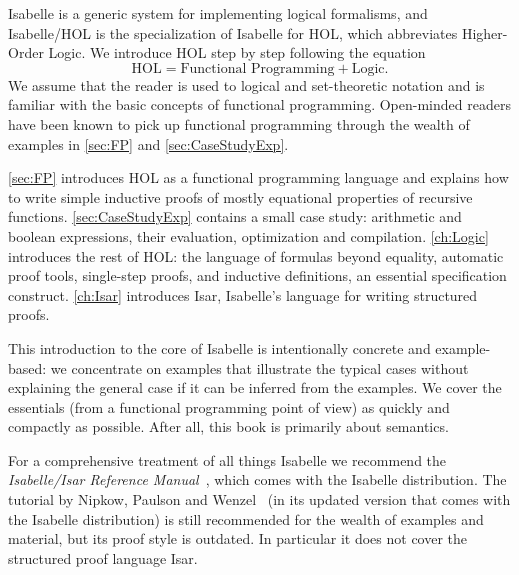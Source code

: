 Isabelle is a generic system for
implementing logical formalisms, and Isabelle/HOL is the specialization
of Isabelle for HOL, which abbreviates Higher-Order Logic. We introduce
HOL step by step following the equation
\[ \mbox{HOL} = \mbox{Functional Programming} + \mbox{Logic}. \]
We assume that the reader is used to logical and set-theoretic notation
and is familiar with the basic concepts of functional programming.
\ifsem
Open-minded readers have been known to pick up functional
programming through the wealth of examples in \autoref{sec:FP}
and \autoref{sec:CaseStudyExp}.
\fi

\autoref{sec:FP} introduces HOL as a functional programming language and
explains how to write simple inductive proofs of mostly equational properties
of recursive functions.
\ifsem
\autoref{sec:CaseStudyExp} contains a
small case study: arithmetic and boolean expressions, their evaluation,
optimization and compilation.
\fi
\autoref{ch:Logic} introduces the rest of HOL: the
language of formulas beyond equality, automatic proof tools, single-step
proofs, and inductive definitions, an essential specification construct.
\autoref{ch:Isar} introduces Isar, Isabelle's language for writing structured
proofs.



This introduction to the core of Isabelle is intentionally concrete and
example-based: we concentrate on examples that illustrate the typical cases
without explaining the general case if it can be inferred from the examples.
We cover the essentials (from a functional programming point of view) as
quickly and compactly as possible.
\ifsem
After all, this book is primarily about semantics.
\fi

For a comprehensive treatment of all things Isabelle we recommend the
\emph{Isabelle/Isar Reference Manual}~\cite{IsarRef}, which comes with the
Isabelle distribution.
The tutorial by Nipkow, Paulson and Wenzel~\cite{LNCS2283} (in its updated version that comes with the Isabelle distribution) is still recommended for the wealth of examples and material, but its proof style is outdated. In particular it does not cover the structured proof language Isar.


